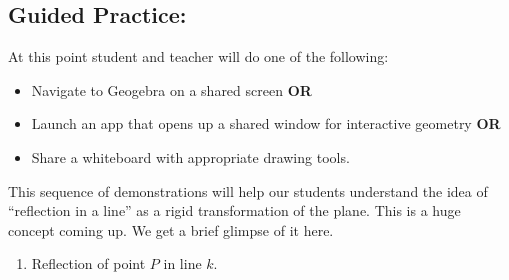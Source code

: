 \documentclass{tufte-handout}
\newcommand{\uv}{\vspace{.1in}}
\begin{document}
\begin{tcolorbox}[enhanced jigsaw,breakable,pad at break*=1mm,attach boxed title to top center={yshift=-3mm,yshifttext=-1mm},
  colback=yellow!50!white,colframe=yellow,colbacktitle=red!80!black,
  title=Lesson Design Specifications (Please Read),fonttitle=\bfseries,
  boxed title style={size=small,colframe=red!50!black} ]
  \section{Guided Practice: }
 At this point student and teacher will do one of the following: 
    \begin{itemize}
      \item Navigate to Geogebra on a shared screen \textbf{OR}
      \item Launch an app that opens up a shared window for interactive geometry \textbf{OR}
      \item Share a whiteboard with appropriate drawing tools.
  \end{itemize}
  
  \uv This sequence of demonstrations will help our students understand the idea of ``reflection in a line'' as a rigid transformation of the plane. This is a huge concept coming up. We get a brief glimpse of it here.
  \pagebreak
  \begin{enumerate}
      \item Reflection of point $P$ in line $k.$
      \begin{center}
      \end{center}
      

\end{enumerate}
\end{tcolorbox}
\end{document}
